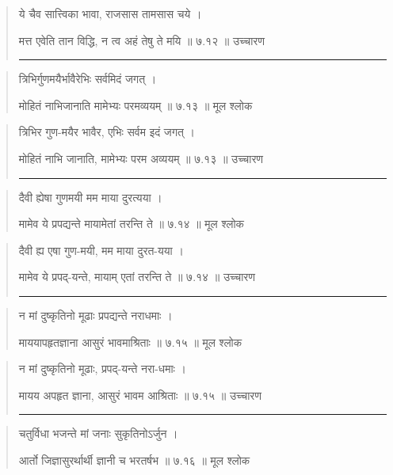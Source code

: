 \begin{quotation}
ये चैव सात्त्विका भावा, राजसास तामसास चये  ।  

मत्त एवेति तान विद्धि, न त्व अहं तेषु ते मयि  ॥ ७.१२ ॥  उच्चारण

\noindent\rule{16cm}{0.4pt} 
\end{quotation}


\begin{quotation} 
त्रिभिर्गुणमयैर्भावैरेभिः सर्वमिदं जगत्‌  ।  

मोहितं नाभिजानाति मामेभ्यः परमव्ययम्‌  ॥ ७.१३ ॥  मूल श्लोक
\end{quotation}

\begin{quotation}
त्रिभिर गुण-मयैर भावैर, एभिः सर्वम इदं जगत्‌  ।  

मोहितं नाभि जानाति, मामेभ्यः परम अव्ययम्‌  ॥ ७.१३ ॥  उच्चारण

\noindent\rule{16cm}{0.4pt} 
\end{quotation}


\begin{quotation} 
दैवी ह्येषा गुणमयी मम माया दुरत्यया  ।  

मामेव ये प्रपद्यन्ते मायामेतां तरन्ति ते  ॥ ७.१४ ॥  मूल श्लोक
\end{quotation}

\begin{quotation}
दैवी ह्य एषा गुण-मयी, मम माया दुरत-यया  ।  

मामेव ये प्रपद्-यन्ते, मायाम् एतां तरन्ति ते  ॥ ७.१४ ॥  उच्चारण

\noindent\rule{16cm}{0.4pt} 
\end{quotation}


\begin{quotation} 
न मां दुष्कृतिनो मूढाः प्रपद्यन्ते नराधमाः  ।  

माययापहृतज्ञाना आसुरं भावमाश्रिताः  ॥ ७.१५ ॥  मूल श्लोक
\end{quotation}

\begin{quotation}
न मां दुष्कृतिनो मूढाः, प्रपद्-यन्ते नरा-धमाः  ।  

मायय अपहृत ज्ञाना, आसुरं भावम आश्रिताः  ॥ ७.१५ ॥  उच्चारण

\noindent\rule{16cm}{0.4pt} 
\end{quotation}


\begin{quotation} 
चतुर्विधा भजन्ते मां जनाः सुकृतिनोऽर्जुन  ।  

आर्तो जिज्ञासुरर्थार्थी ज्ञानी च भरतर्षभ  ॥ ७.१६ ॥  मूल श्लोक
\end{quotation}

